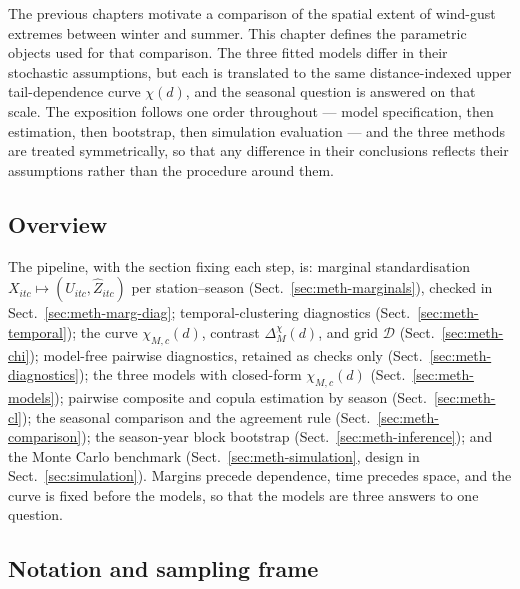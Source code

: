 The previous chapters motivate a comparison of the spatial extent of wind-gust extremes between winter and summer. This chapter defines the parametric objects used for that comparison. The three fitted models differ in their stochastic assumptions, but each is translated to the same distance-indexed upper tail-dependence curve \(\chi(d)\), and the seasonal question is answered on that scale. The exposition follows one order throughout --- model specification, then estimation, then bootstrap, then simulation evaluation --- and the three methods are treated symmetrically, so that any difference in their conclusions reflects their assumptions rather than the procedure around them.

\subsection{Overview}\label{sec:meth-overview}

The pipeline, with the section fixing each step, is: marginal standardisation \(X_{itc}\mapsto(\widehat U_{itc},\widehat Z_{itc})\) per station--season (Sect.~\ref{sec:meth-marginals}), checked in Sect.~\ref{sec:meth-marg-diag}; temporal-clustering diagnostics (Sect.~\ref{sec:meth-temporal}); the curve \(\chi_{M,c}(d)\), contrast \(\Delta_M^{\chi}(d)\), and grid \(\mathcal D\) (Sect.~\ref{sec:meth-chi}); model-free pairwise diagnostics, retained as checks only (Sect.~\ref{sec:meth-diagnostics}); the three models with closed-form \(\chi_{M,c}(d)\) (Sect.~\ref{sec:meth-models}); pairwise composite and copula estimation by season (Sect.~\ref{sec:meth-cl}); the seasonal comparison and the agreement rule (Sect.~\ref{sec:meth-comparison}); the season-year block bootstrap (Sect.~\ref{sec:meth-inference}); and the Monte Carlo benchmark (Sect.~\ref{sec:meth-simulation}, design in Sect.~\ref{sec:simulation}). Margins precede dependence, time precedes space, and the curve is fixed before the models, so that the models are three answers to one question.

\subsection{Notation and sampling frame}\label{sec:meth-notation}

